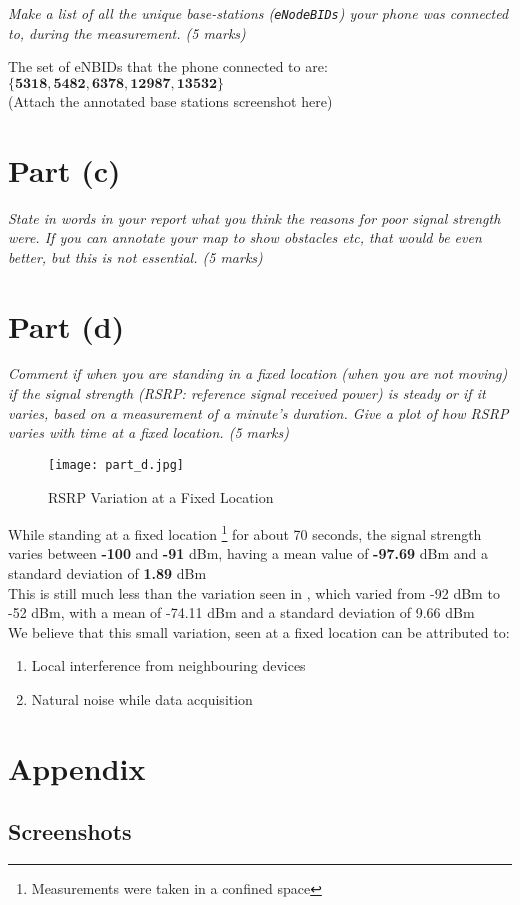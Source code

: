 \documentclass[11pt, fleqn]{article}
\begin{document}
\textit{Make a list of all the unique base-stations (\texttt{eNodeBIDs}) your phone was connected to, during the measurement. (5 marks)}

\medskip

The set of eNBIDs that the phone connected to are: 
$\mathbf{\{ 5318, 5482, 6378, 12987, 13532 \}}$\\
(Attach the annotated base stations screenshot here)

\newpage
\section*{Part (c)}
\setcounter{equation}{0}
\setcounter{figure}{0}

\textit{State in words in your report what you think the reasons for poor signal strength were. If you can annotate your map to show obstacles etc, that would be even better, but this is not essential. (5 marks)}


\newpage
\section*{Part (d)}
\setcounter{equation}{0}
\setcounter{figure}{0}

\textit{Comment if when you are standing in a fixed location (when you are not moving) if the signal strength (RSRP: reference signal received power) is steady or if it varies, based on a measurement of a minute’s duration. Give a plot of how RSRP varies with time at a fixed location. (5 marks)}

\begin{figure}[H]
    \centering
    \texttt{[image: part\_d.jpg]}
    \caption{RSRP Variation at a Fixed Location}
\end{figure}

While standing at a fixed location 
\footnote{Measurements were taken in a confined space} 
for about 70 seconds, the signal strength varies between \textbf{-100} and
\textbf{-91} dBm, having a mean value of \textbf{-97.69} dBm and a standard deviation of \textbf{1.89} dBm\\

This is still much less than the variation seen in , which varied from -92 dBm to -52 dBm, with a mean of -74.11 dBm and a standard deviation of 9.66 dBm\\

We believe that this small variation, seen at a fixed location can be attributed to:
\begin{enumerate}[itemsep=-1ex]
    \item Local interference from neighbouring devices
    \item Natural noise while data acquisition 
\end{enumerate}


\newpage
\section*{Appendix}
\setcounter{equation}{0}
\setcounter{figure}{0}

\subsection*{Screenshots}
\end{document}
